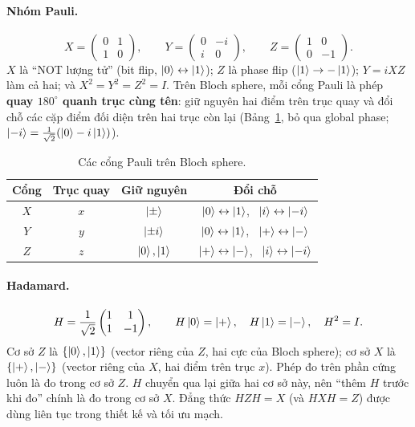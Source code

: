 \paragraph{Nhóm Pauli.}
\begin{equation}
  X = \begin{pmatrix}0&1\\1&0\end{pmatrix}, \qquad
  Y = \begin{pmatrix}0&-i\\i&0\end{pmatrix}, \qquad
  Z = \begin{pmatrix}1&0\\0&-1\end{pmatrix}.
\end{equation}
$X$ là ``NOT lượng tử'' (bit flip, $\ket{0}\leftrightarrow\ket{1}$); $Z$ là phase flip
($\ket{1}\to-\ket{1}$); $Y = iXZ$ làm cả hai; và $X^2 = Y^2 = Z^2 = I$. Trên Bloch sphere, mỗi cổng
Pauli là phép \textbf{quay $180^\circ$ quanh trục cùng tên}: giữ nguyên hai điểm trên trục quay và đổi
chỗ các cặp điểm đối diện trên hai trục còn lại (Bảng~\ref{tab:pauli-bloch}, bỏ qua global phase;
$\ket{-i} = \tfrac{1}{\sqrt2}(\ket{0} - i\ket{1})$).

\begin{table}[h]
  \centering
  \caption{Các cổng Pauli trên Bloch sphere.}
  \label{tab:pauli-bloch}
  \small
  \begin{tabular}{@{}cccc@{}}
    \toprule
    \textbf{Cổng} & \textbf{Trục quay} & \textbf{Giữ nguyên} & \textbf{Đổi chỗ} \\
    \midrule
    $X$ & $x$ & $\ket{\pm}$ & $\ket{0}\leftrightarrow\ket{1}$, \ $\ket{i}\leftrightarrow\ket{-i}$ \\
    $Y$ & $y$ & $\ket{\pm i}$ & $\ket{0}\leftrightarrow\ket{1}$, \ $\ket{+}\leftrightarrow\ket{-}$ \\
    $Z$ & $z$ & $\ket{0}, \ket{1}$ & $\ket{+}\leftrightarrow\ket{-}$, \ $\ket{i}\leftrightarrow\ket{-i}$ \\
    \bottomrule
  \end{tabular}
\end{table}

\paragraph{Hadamard.}
\begin{equation}
  H = \frac{1}{\sqrt2}\begin{pmatrix}1&1\\1&-1\end{pmatrix}, \qquad
  H\ket{0} = \ket{+}, \quad H\ket{1} = \ket{-}, \quad H^2 = I.
\end{equation}
Cơ sở $Z$ là $\{\ket{0},\ket{1}\}$ (vector riêng của $Z$, hai cực của Bloch sphere); cơ sở $X$ là
$\{\ket{+},\ket{-}\}$ (vector riêng của $X$, hai điểm trên trục $x$). Phép đo trên phần cứng luôn
là đo trong cơ sở $Z$. $H$ chuyển qua lại giữa hai cơ sở này, nên ``thêm $H$ trước khi đo'' chính là
đo trong cơ sở $X$. Đẳng thức $HZH = X$ (và $HXH = Z$) được dùng liên tục trong thiết kế và tối ưu mạch.

